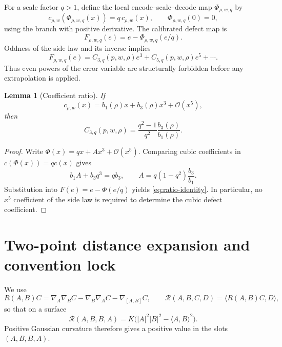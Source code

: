 \documentclass[11pt]{amsart}
\numberwithin{equation}{section}
\newtheorem{lemma}[theorem]{Lemma}
\theoremstyle{remark}
\newcommand{\Riem}{\mathcal{R}}
\newcommand{\bigO}{\mathcal{O}}
\begin{document}
For a scale factor $q>1$, define the local encode--scale--decode map $\Phi_{\rho,w,q}$ by
\begin{equation}\label{eq:phi}
 c_{\rho,w}(\Phi_{\rho,w,q}(x))=q\,c_{\rho,w}(x),
 \qquad \Phi_{\rho,w,q}(0)=0,
\end{equation}
using the branch with positive derivative.  The calibrated defect map is
\begin{equation}\label{eq:defect}
 F_{\rho,w,q}(e)=e-\Phi_{\rho,w,q}(e/q).
\end{equation}
Oddness of the side law and its inverse implies
\begin{equation}\label{eq:error-spectrum}
 F_{\rho,w,q}(e)=C_{3,q}(p,w,\rho)e^3+C_{5,q}(p,w,\rho)e^5+\cdots.
\end{equation}
Thus even powers of the error variable are structurally forbidden before any extrapolation is applied.

\begin{lemma}[Coefficient ratio]\label{lem:ratio}
If
\[
 c_{\rho,w}(x)=b_1(\rho)x+b_3(\rho)x^3+\bigO(x^5),
\]
then
\begin{equation}\label{eq:ratio-identity}
 C_{3,q}(p,w,\rho)=\frac{q^2-1}{q^2}\frac{b_3(\rho)}{b_1(\rho)}.
\end{equation}
\end{lemma}

\begin{proof}
Write $\Phi(x)=qx+Ax^3+\bigO(x^5)$.  Comparing cubic coefficients in $c(\Phi(x))=q c(x)$ gives
\[
 b_1A+b_3q^3=qb_3,
 \qquad
 A=q(1-q^2)\frac{b_3}{b_1}.
\]
Substitution into $F(e)=e-\Phi(e/q)$ yields \eqref{eq:ratio-identity}.  In particular, no $x^5$ coefficient of the side law is required to determine the cubic defect coefficient.
\end{proof}

\section{Two-point distance expansion and convention lock}\label{sec:distance}

We use
\[
 R(A,B)C=\nabla_A\nabla_BC-\nabla_B\nabla_AC-\nabla_{[A,B]}C,
 \qquad
 \Riem(A,B,C,D)=\langle R(A,B)C,D\rangle,
\]
so that on a surface
\begin{equation}\label{eq:R-convention}
 \Riem(A,B,B,A)=K\bigl(|A|^2|B|^2-\langle A,B\rangle^2\bigr).
\end{equation}
Positive Gaussian curvature therefore gives a positive value in the slots $(A,B,B,A)$.
\end{document}
